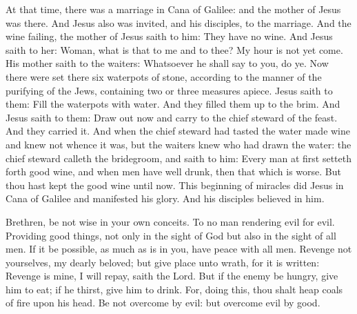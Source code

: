 At that time, there was a marriage in Cana of Galilee: and the mother of
Jesus was there.  And Jesus also was invited, and his disciples, to the
marriage.  And the wine failing, the mother of Jesus saith to him: They have no
wine.  And Jesus saith to her: Woman, what is that to me and to thee? My hour
is not yet come.   His mother saith to the waiters:
Whatsoever he shall say to you, do ye.  Now there were set there six waterpots
of stone, according to the manner of the purifying of the Jews, containing two
or three measures apiece.  Jesus saith to them: Fill the waterpots with water.
And they filled them up to the brim.  And Jesus saith to them: Draw out now and
carry to the chief steward of the feast. And they carried it.  And when the
chief steward had tasted the water made wine and knew not whence it was, but
the waiters knew who had drawn the water: the chief steward calleth the
bridegroom, and saith to him: Every man at first setteth forth good wine, and
when men have well drunk, then that which is worse.  But thou hast kept the
good wine until now.  This beginning of miracles did Jesus in Cana of Galilee
and manifested his glory. And his disciples believed in him.






Brethren, %
be not wise in your own conceits.  To no man rendering evil for
evil. Providing good things, not only in the sight of God but also in the sight
of all men.  If it be possible, as much as is in you, have peace with all men.
Revenge not yourselves, my dearly beloved; but give place unto wrath, for it is
written: Revenge is mine, I will repay, saith the Lord.  But if the enemy be
hungry, give him to eat; if he thirst, give him to drink. For, doing this, thou
shalt heap coals of fire upon his head.  Be not overcome by evil: but overcome
evil by good.



